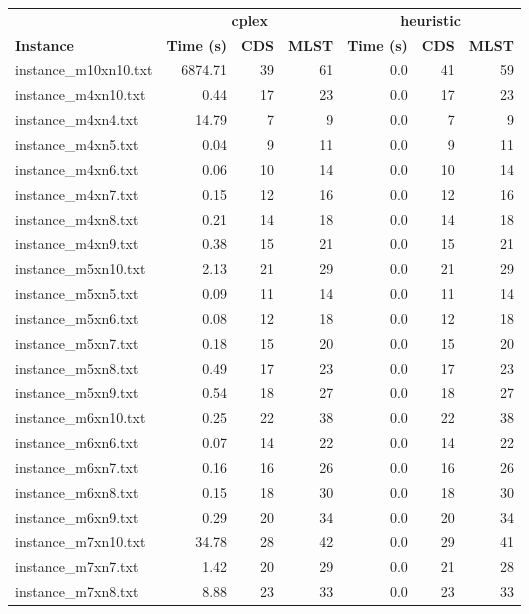 \documentclass{article}
\begin{document}
\begin{center}
\renewcommand{\arraystretch}{1.4}
 \begin{tabular}{lrrrrrr}
	\hline
 & \multicolumn{3}{c}{\textbf{cplex}} & \multicolumn{3}{c}{\textbf{heuristic}}\\
\textbf{Instance}  & \textbf{Time (s)} & \textbf{CDS} & \textbf{MLST}   & \textbf{Time (s)} & \textbf{CDS} & \textbf{MLST}  \\\hline

instance\_m10xn10.txt & 6874.71 & 39 & 61
 & 0.0 & 41 & 59
\\
instance\_m4xn10.txt & 0.44 & 17 & 23
 & 0.0 & 17 & 23
\\
instance\_m4xn4.txt & 14.79 & 7 & 9
 & 0.0 & 7 & 9
\\
instance\_m4xn5.txt & 0.04 & 9 & 11
 & 0.0 & 9 & 11
\\
instance\_m4xn6.txt & 0.06 & 10 & 14
 & 0.0 & 10 & 14
\\
instance\_m4xn7.txt & 0.15 & 12 & 16
 & 0.0 & 12 & 16
\\
instance\_m4xn8.txt & 0.21 & 14 & 18
 & 0.0 & 14 & 18
\\
instance\_m4xn9.txt & 0.38 & 15 & 21
 & 0.0 & 15 & 21
\\
instance\_m5xn10.txt & 2.13 & 21 & 29
 & 0.0 & 21 & 29
\\
instance\_m5xn5.txt & 0.09 & 11 & 14
 & 0.0 & 11 & 14
\\
instance\_m5xn6.txt & 0.08 & 12 & 18
 & 0.0 & 12 & 18
\\
instance\_m5xn7.txt & 0.18 & 15 & 20
 & 0.0 & 15 & 20
\\
instance\_m5xn8.txt & 0.49 & 17 & 23
 & 0.0 & 17 & 23
\\
instance\_m5xn9.txt & 0.54 & 18 & 27
 & 0.0 & 18 & 27
\\
instance\_m6xn10.txt & 0.25 & 22 & 38
 & 0.0 & 22 & 38
\\
instance\_m6xn6.txt & 0.07 & 14 & 22
 & 0.0 & 14 & 22
\\
instance\_m6xn7.txt & 0.16 & 16 & 26
 & 0.0 & 16 & 26
\\
instance\_m6xn8.txt & 0.15 & 18 & 30
 & 0.0 & 18 & 30
\\
instance\_m6xn9.txt & 0.29 & 20 & 34
 & 0.0 & 20 & 34
\\
instance\_m7xn10.txt & 34.78 & 28 & 42
 & 0.0 & 29 & 41
\\
instance\_m7xn7.txt & 1.42 & 20 & 29
 & 0.0 & 21 & 28
\\
instance\_m7xn8.txt & 8.88 & 23 & 33
 & 0.0 & 23 & 33
\\

\end{tabular}
\end{center}
\end{document}
